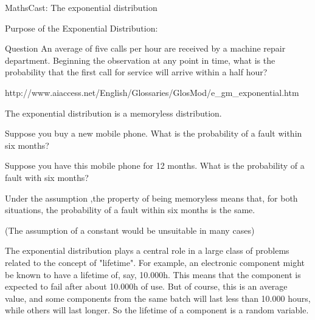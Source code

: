 MathsCast: The exponential distribution
 
 

Purpose of the Exponential Distribution:

Question 
An average of five calls per hour are received by a machine repair department. 
Beginning the observation at any point in time, what is the probability that the first call for service will arrive within a half hour?



http://www.aiaccess.net/English/Glossaries/GlosMod/e_gm_exponential.htm



The exponential distribution is a memoryless distribution.

Suppose you buy a new mobile phone. What is the probability of a fault within six months?

Suppose you have this mobile phone for 12 months. What is the probability of a fault with six months?

Under the assumption ,the property of being memoryless means that, for both situations, the probability of a fault within six months is the same.

(The assumption of a constant would be unsuitable in many cases)


The exponential distribution plays a central role in a large class of problems related to the concept of "lifetime". 
For example, an electronic component might be known to have a lifetime of, say, 10.000h. 
This means that the component is expected to fail after about 10.000h of use. 
But of course, this is an average value, and some components from the same batch will last less than 10.000 hours, while others will last longer. 
So the lifetime of a component is a random variable.




 
 
